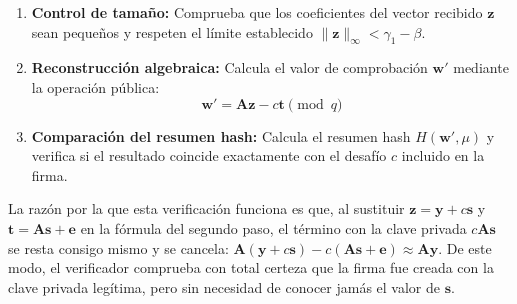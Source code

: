 \begin{enumerate}
	\item \textbf{Control de tamaño:} Comprueba que los coeficientes del vector recibido $\mathbf{z}$ sean pequeños y respeten el límite establecido $\|\mathbf{z}\|_\infty < \gamma_1 - \beta$.

	\item \textbf{Reconstrucción algebraica:} Calcula el valor de comprobación $\mathbf{w}'$ mediante la operación pública:
	\begin{equation}
		\mathbf{w}' = \mathbf{A}\mathbf{z} - c\mathbf{t} \pmod q
	\end{equation}

	\item \textbf{Comparación del resumen hash:} Calcula el resumen hash $H(\mathbf{w}', \mu)$ y verifica si el resultado coincide exactamente con el desafío $c$ incluido en la firma.
\end{enumerate}

La razón por la que esta verificación funciona es que, al sustituir $\mathbf{z} = \mathbf{y} + c\mathbf{s}$ y $\mathbf{t} = \mathbf{A}\mathbf{s} + \mathbf{e}$ en la fórmula del segundo paso, el término con la clave privada $c\mathbf{A}\mathbf{s}$ se resta consigo mismo y se cancela: $\mathbf{A}(\mathbf{y} + c\mathbf{s}) - c(\mathbf{A}\mathbf{s} + \mathbf{e}) \approx \mathbf{A}\mathbf{y}$. De este modo, el verificador comprueba con total certeza que la firma fue creada con la clave privada legítima, pero sin necesidad de conocer jamás el valor de $\mathbf{s}$.

